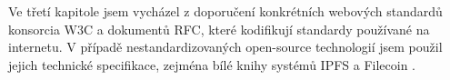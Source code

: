 Ve třetí kapitole jsem vycházel z doporučení konkrétních webových standardů konsorcia W3C a dokumentů RFC, které kodifikují standardy používané na internetu. V případě nestandardizovaných open-source technologií jsem použil jejich technické specifikace, zejména bílé knihy systémů IPFS \autocite{IPFS} a Filecoin \autocite{Filecoin2017}.